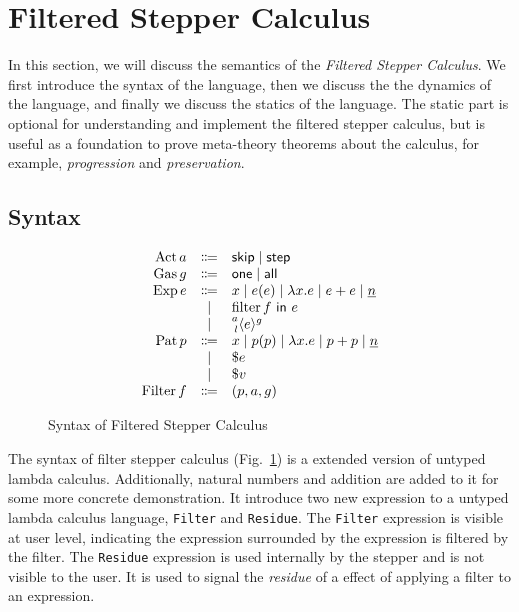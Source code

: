 \section{Filtered Stepper Calculus}

In this section, we will discuss the semantics of the \emph{Filtered Stepper
Calculus}. We first introduce the syntax of the language, then we discuss the
the dynamics of the language, and finally we discuss the statics of the
language. The static part is optional for understanding and implement the filtered
stepper calculus, but is useful as a foundation to prove meta-theory theorems
about the calculus, for example, \emph{progression} and \emph{preservation}.


\subsection{Syntax}

\begin{figure}[h]
  \begin{equation*}
    \begin{array}{rcl}
      \DefAct a    &\Coloneqq& \ActSkip \mid \ActStep \\
      \DefGas g    &\Coloneqq& \GasOne \mid \GasAll \\
      \DefExp e    &\Coloneqq& x \mid e(e) \mid \Lam{x}{e} \mid e + e \mid \Nat{n} \\
                   &\mid     & \Filter{f}{e} \\
                   &\mid     & \Residue{a}{g}{l}{e} \\
      \DefPat p    &\Coloneqq& x \mid p(p) \mid \Lam{x}{e} \mid p + p \mid \Nat{n} \\
                   &\mid     & \$e \\
                   &\mid     & \$v \\
      \DefFilter f &\Coloneqq& (p, a, g) \\
    \end{array}
  \end{equation*}
  \caption{Syntax of Filtered Stepper Calculus}
  \label{fig:filter-syntax}
\end{figure}


The syntax of filter stepper calculus (Fig.~\ref{fig:filter-syntax}) is a
extended version of untyped lambda calculus. Additionally, natural numbers and
addition are added to it for some more concrete demonstration. It introduce two
new expression to a untyped lambda calculus language, \texttt{Filter} and
\texttt{Residue}. The \texttt{Filter} expression is visible at user level,
indicating the expression surrounded by the expression is filtered by the
filter. The \texttt{Residue} expression is used internally by the stepper and is
not visible to the user. It is used to signal the \emph{residue} of a effect of
applying a filter to an expression.

